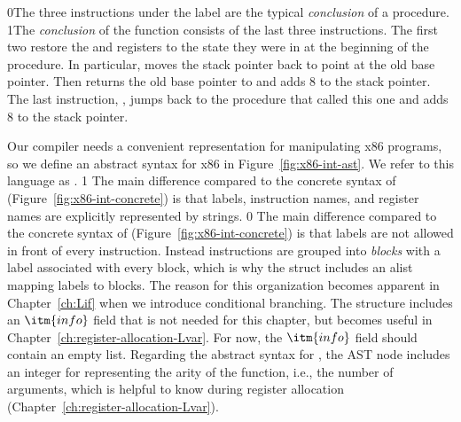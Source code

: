 \documentclass[7x10,nocrop]{TimesAPriori_MIT}%
\def\racketEd{0}
\def\pythonEd{1}
\def\edition{1}
\newcommand{\racket}[1]{{\if\edition\racketEd{#1}\fi}}
\newcommand{\python}[1]{{\if\edition\pythonEd #1\fi}}
\begin{document}
\racket{The three instructions under the label  are the
  typical \emph{conclusion} of a procedure.}
%
\python{The \emph{conclusion}\index{subject}{conclusion} of the
  \code{main} function consists of the last three instructions.}
%
The first two restore the  and  registers to the
state they were in at the beginning of the procedure. In particular,
 moves the stack pointer back to point at the
old base pointer. Then  returns the old base pointer
to  and adds $8$ to the stack pointer.  The last instruction,
, jumps back to the procedure that called this one and adds
$8$ to the stack pointer.

Our compiler needs a convenient representation for manipulating x86
programs, so we define an abstract syntax for x86 in
Figure~\ref{fig:x86-int-ast}. We refer to this language as
\LangXInt{}.
%
{\if\edition\pythonEd%
  The main difference compared to the concrete syntax of \LangXInt{}
  (Figure~\ref{fig:x86-int-concrete}) is that labels, instruction
  names, and register names are explicitly represented by strings. 
\fi} %
{\if\edition\racketEd  
The main difference compared to the concrete syntax of \LangXInt{}
(Figure~\ref{fig:x86-int-concrete}) is that labels are not allowed in
front of every instruction. Instead instructions are grouped into
\emph{blocks} with a
label associated with every block, which is why the 
struct includes an alist mapping labels to blocks. The reason for this
organization becomes apparent in Chapter~\ref{ch:Lif} when we
introduce conditional branching. The  structure includes
an $\itm{info}$ field that is not needed for this chapter, but becomes
useful in Chapter~\ref{ch:register-allocation-Lvar}.  For now, the
$\itm{info}$ field should contain an empty list.
\fi}
%
Regarding the abstract syntax for , the  AST
node includes an integer for representing the arity of the function,
i.e., the number of arguments, which is helpful to know during
register allocation (Chapter~\ref{ch:register-allocation-Lvar}).

\newcommand{\allastregisters}{\skey{rsp} \MID \skey{rbp} \MID \skey{rax} \MID \skey{rbx} \MID \skey{rcx}
              \MID \skey{rdx} \MID \skey{rsi} \MID \skey{rdi} \MID \\
              && \skey{r8} \MID \skey{r9} \MID \skey{r10}
              \MID \skey{r11} \MID \skey{r12} \MID \skey{r13}
              \MID \skey{r14} \MID \skey{r15}}
\end{document}
